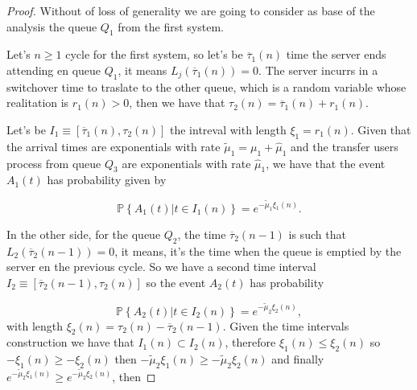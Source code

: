 \documentclass{article}
\newcommand{\prob}{\mathbb{P}}
\begin{document}
\begin{proof}

Without of loss of generality we are going to consider as base of the analysis the queue $Q_{1}$ from the first system.

Let's $n\geq1$ cycle for the first system, so let's be $\overline{\tau}_{1}\left(n\right)$ time the server ends attending en queue $Q_{1}$, it means 
$L_{j}\left(\overline{\tau}_{1}\left(n\right)\right)=0$. The server incurrs in a switchover time to traslate to the other queue, which is a random variable whose realitation is $r_{1}\left(n\right)>0$, then we have that $\tau_{2}\left(n\right)=\overline{\tau}_{1}\left(n\right)+r_{1}\left(n\right)$.

Let's be $I_{1}\equiv\left[\overline{\tau}_{1}\left(n\right),\tau_{2}\left(n\right)\right]$ the intreval with length $\xi_{1}=r_{1}\left(n\right)$. Given that the arrival times are exponentials with rate $\tilde{\mu}_{1}=\mu_{1}+\hat{\mu}_{1}$ and the transfer users process from queue $Q_{3}$ are exponentials with rate $\hat{\mu}_{1}$, we have that the event $A_{1}\left(t\right)$ has probability given by 

\begin{equation}
\prob\left\{A_{1}\left(t\right)|t\in I_{1}\left(n\right)\right\}=e^{-\tilde{\mu}_{1}\xi_{1}\left(n\right)}.
\end{equation} 

In the other side, for the queue $Q_{2}$, the time 
$\overline{\tau}_{2}\left(n-1\right)$ is such that 
$L_{2}\left(\overline{\tau}_{2}\left(n-1\right)\right)=0$, it means, it's the time when the queue is emptied by the server en the previous cycle. So we have a second time interval $I_{2}\equiv\left[\overline{\tau}_{2}\left(n-1\right),\tau_{2}\left(n\right)\right]$ so the event $A_{2}\left(t\right)$ has probability

\begin{equation}
\prob\left\{A_{2}\left(t\right)|t\in I_{2}\left(n\right)\right\}=e^{-\tilde{\mu}_{2}\xi_{2}\left(n\right)},
\end{equation} 
with length 
$\xi_{2}\left(n\right)=\tau_{2}\left(n\right)-\overline{\tau}_{2}\left(n-1\right)$. Given the time intervals construction we have that $I_{1}\left(n\right)\subset I_{2}\left(n\right)$, therefore  $\xi_{1}\left(n\right)\leq\xi_{2}\left(n\right)$ so $-\xi_{1}\left(n\right)\geq-\xi_{2}\left(n\right)$ then $-\tilde{\mu}_{2}\xi_{1}\left(n\right)\geq-\tilde{\mu}_{2}\xi_{2}\left(n\right)$ and finally $e^{-\tilde{\mu}_{2}\xi_{1}\left(n\right)}\geq e^{-\tilde{\mu}_{2}\xi_{2}\left(n\right)}$, then


\end{proof}
\end{document}
